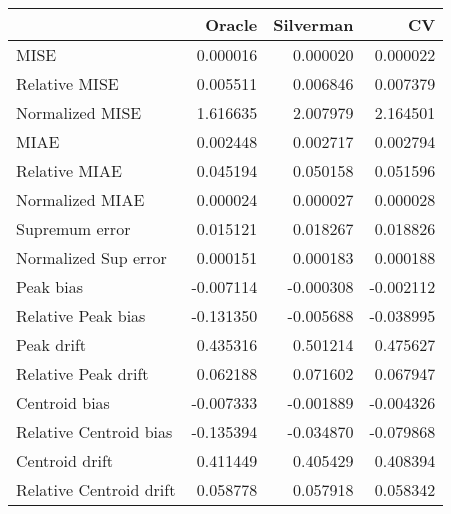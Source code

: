 \begin{tabular}{lrrr}
  \toprule
 & Oracle & Silverman & CV \\ 
  \midrule
MISE & 0.000016 & 0.000020 & 0.000022 \\ 
  Relative MISE & 0.005511 & 0.006846 & 0.007379 \\ 
  Normalized MISE & 1.616635 & 2.007979 & 2.164501 \\ 
  MIAE & 0.002448 & 0.002717 & 0.002794 \\ 
  Relative MIAE & 0.045194 & 0.050158 & 0.051596 \\ 
  Normalized MIAE & 0.000024 & 0.000027 & 0.000028 \\ 
  Supremum error & 0.015121 & 0.018267 & 0.018826 \\ 
  Normalized Sup error & 0.000151 & 0.000183 & 0.000188 \\ 
  Peak bias & -0.007114 & -0.000308 & -0.002112 \\ 
  Relative Peak bias & -0.131350 & -0.005688 & -0.038995 \\ 
  Peak drift & 0.435316 & 0.501214 & 0.475627 \\ 
  Relative Peak drift & 0.062188 & 0.071602 & 0.067947 \\ 
  Centroid bias & -0.007333 & -0.001889 & -0.004326 \\ 
  Relative Centroid bias & -0.135394 & -0.034870 & -0.079868 \\ 
  Centroid drift & 0.411449 & 0.405429 & 0.408394 \\ 
  Relative Centroid drift & 0.058778 & 0.057918 & 0.058342 \\ 
   \bottomrule
\end{tabular}
